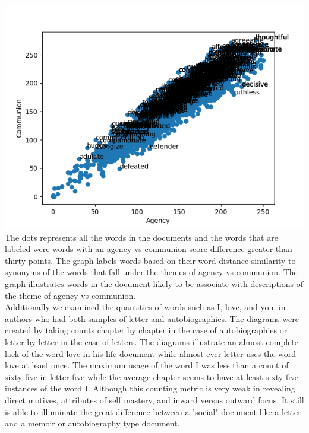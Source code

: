 \documentclass{article}
\begin{document}
   
   \includegraphics[width=0.8\linewidth]{greater_than30.png}
   \\
    The dots represents all the words in the documents and the words that are labeled were words with an agency vs communion score difference greater than thirty points. The graph labels words based on their word distance similarity to synonyms of the words that fall under the themes of agency vs communion. The graph illustrates words in the document likely to be associate with descriptions of the theme of agency vs communion. \\
    Additionally we examined the quantities of words such as I, love, and you, in authors who had both samples of letter and autobiographies. The diagrams were created by taking counts chapter by chapter in the case of autobiographies or letter by letter in the case of letters. The diagrams illustrate an almost complete lack of the word love in his life document while almost ever letter uses the word love at least once. The maximum usage of the word I was less than a count of sixty five in letter five while the average chapter seems to have at least sixty five instances of the word I. Although this counting metric is very weak in revealing direct motives, attributes of self mastery, and inward versus outward focus. It still is able to illuminate the great difference between a "social" document like a letter and a memoir or autobiography type document.
    \\
\end{document}
